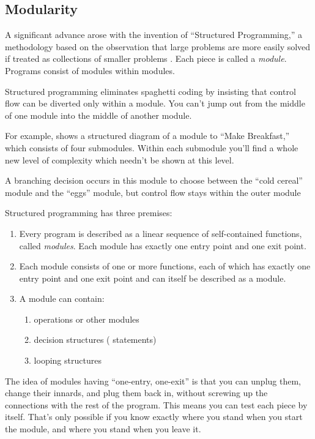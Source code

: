 \subsection{Modularity}%
%
%
A significant advance arose with the invention of ``Structured
Programming,'' a methodology based on the observation that large problems
are more easily solved if treated as collections of smaller problems
\cite{dahl72}. Each piece is called a \emph{module}.
Programs consist of modules within modules.

Structured programming eliminates spaghetti coding by insisting that
control flow can be diverted only within a
module.  You can't jump out from the middle of one module into the
middle of another module.

For example,  shows a structured diagram of a module to
``Make Breakfast,'' which consists of four submodules. Within each
submodule you'll find a whole new level of complexity which needn't be
shown at this level.


A branching decision occurs in this module to choose between the
``cold cereal'' module and the ``eggs'' module, but control flow stays
within the outer module

Structured programming has three premises:%

\begin{enumerate}\parsep=0pt\itemsep=0pt
\item Every program is described as a linear sequence of
self-contained functions, called \emph{modules}. Each module has
exactly one entry point and one exit point.
\item Each module consists of one or more functions, each of which has
exactly one entry point and one exit point and can itself be described
as a module.
\item A module can contain:
\begin{enumerate}
\item operations or other modules
\item decision structures (  statements)
\item looping structures
\end{enumerate}
\end{enumerate}
The idea of modules having ``one-entry, one-exit'' is that you
can unplug them, change their innards, and plug them back in, without
screwing up the connections with the rest of the program. This means
you can test each piece by itself. That's only possible if you know
exactly where you stand when you start the module, and where you stand
when you leave it.

